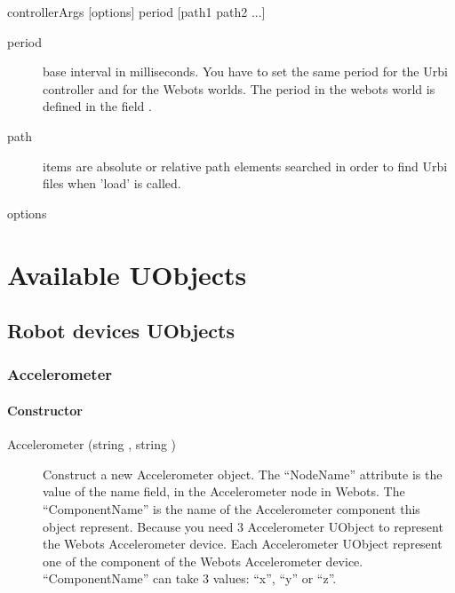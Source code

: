 \begin{shell}
controllerArgs [options] period [path1 path2 ...]
\end{shell}

\begin{description}
\item[period] base \urbi interval in milliseconds. You have to set the
  same period for the Urbi controller and for the Webots worlds. The
  period in the webots world is defined in the field
  .

\item[path] items are absolute or relative path elements searched in
  order to find Urbi files when 'load' is called.

\item[options]
\end{description}


\section{Available UObjects}

\subsection{Robot devices UObjects}

\subsubsection{Accelerometer}

\paragraph{Constructor}

\noindent
\begin{description}
\item[{Accelerometer (string , string
    )}] Construct a new Accelerometer object.  The
  ``NodeName'' attribute is the value of the name field, in the
  Accelerometer node in Webots.  The ``ComponentName'' is the name of
  the Accelerometer component this object represent.  Because you need
  3 Accelerometer UObject to represent the Webots Accelerometer
  device. Each Accelerometer UObject represent one of the component of
  the Webots Accelerometer device.  ``ComponentName'' can take 3
  values: ``x'', ``y'' or ``z''.

\end{description}

